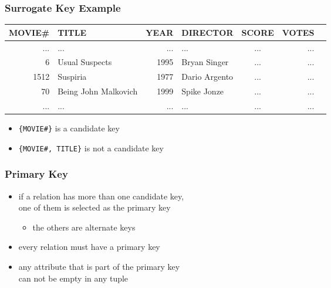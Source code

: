 \documentclass[dvipsnames]{beamer}
\theoremstyle{plain}
\begin{document}
\begin{frame}
  \frametitle{Surrogate Key Example}

  \begin{example}
    \begin{tiny}
    \begin{table}
      \begin{tabular}{|r|l|r|l|c|r|r|}\hline
MOVIE\# & TITLE                & YEAR & DIRECTOR      & SCORE & VOTES\\\hline\hline
    ... & ...                  &  ... & ...           & ...   &   ...\\\hline
      6 & Usual Suspects       & 1995 & Bryan Singer  & ...   &   ...\\\hline
   1512 & Suspiria             & 1977 & Dario Argento & ...   &   ...\\\hline
     70 & Being John Malkovich & 1999 & Spike Jonze   & ...   &   ...\\\hline
    ... & ...                  &  ... & ...           & ...   &   ...\\\hline
      \end{tabular}
    \end{table}
    \end{tiny}

    \begin{itemize}
      \item \texttt{\{MOVIE\#\}} is a candidate key
      \item \texttt{\{MOVIE\#, TITLE\}} is not a candidate key
    \end{itemize}
  \end{example}
\end{frame}

\begin{frame}
  \frametitle{Primary Key}

  \begin{itemize}
    \item if a relation has more than one candidate key,\\
      one of them is selected as the \alert{primary key}
    \begin{itemize}
      \item the others are alternate keys
    \end{itemize}

    \medskip
    \item every relation must have a primary key

    \pause
    \medskip
    \item any attribute that is part of the primary key\\
      can not be empty in any tuple
  \end{itemize}
\end{frame}
\end{document}
